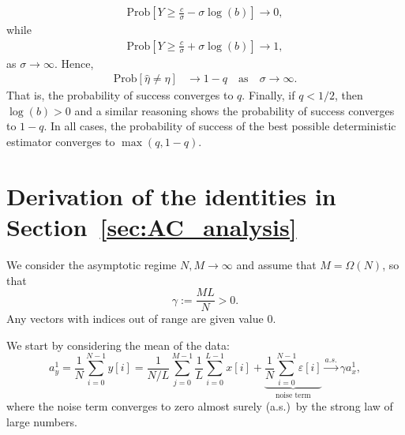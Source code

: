 \documentclass[12pt]{article}
\newcommand{\1}{\mathbf{1}}
\renewcommand{\P}{\mathrm{Prob}}
\theoremstyle{plain}
\theoremstyle{definition}
\theoremstyle{remark}
\theoremstyle{plain}
\theoremstyle{remark}
\theoremstyle{plain}
\theoremstyle{plain}
\begin{document}
%
\begin{align*}
%
\P\left[Y \ge \frac{c}{\sigma} - \sigma \log(b) \right] \longrightarrow 0,
%
\end{align*}
%
while
%
\begin{align*}
%
\P\left[Y \ge \frac{c}{\sigma} + \sigma \log(b) \right] \longrightarrow 1,
%
\end{align*}
%
as $\sigma \to \infty$. Hence,
%
\begin{align*}
%
\P[\hat{\eta} \ne \eta]
& \longrightarrow 1-q  \quad \text{as} \quad  \sigma \to \infty.
%
\end{align*}
That is, the probability of success converges to $q$.
Finally, if $q < 1/2$, then $\log(b) > 0$ and a similar reasoning shows the probability of success converges to $1-q$.
In all cases, the probability of success of the best possible deterministic estimator converges to $\max(q, 1-q)$.

\section{Derivation of the identities in Section~\ref{sec:AC_analysis}} \label{sec:autocorrelation_computation}

We consider the asymptotic regime $N,M\to\infty$ and assume that $M=\Omega(N)$, so that
\begin{equation*}
\gamma := \frac{ML}{N}>0.
\end{equation*}
%
Any vectors with indices out of range are given value 0.

We start by considering the mean of the data:
\begin{equation*}
a_y^1 = \frac{1}{N}\sum_{i=0}^{N-1} y[i] =
\frac{1}{N/L}\sum_{j=0}^{M-1}\frac{1}{L}\sum_{i=0}^{L-1}x[i] +    
\underbrace{\frac{1}{N}\sum_{i=0}^{N-1}\varepsilon[i]}_{\text{noise term}}
\xrightarrow{a.s.}\gamma a_x^1,
\end{equation*}
%
where the noise term converges to zero almost surely (a.s.)\ by the strong law of large numbers.
\end{document}
